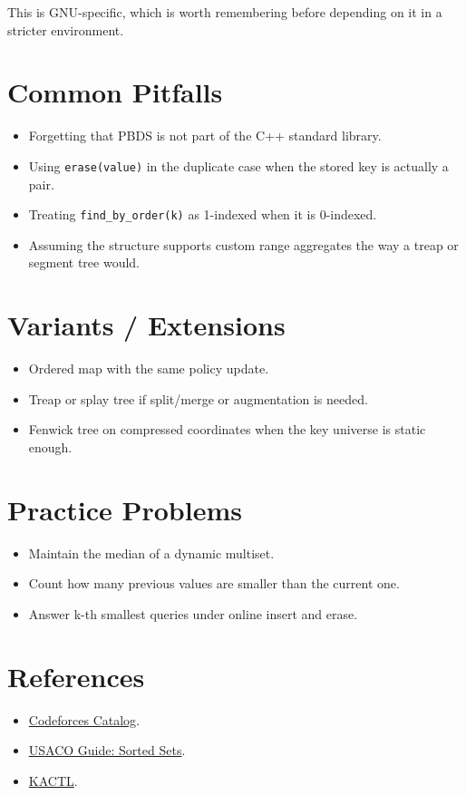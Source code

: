 This is GNU-specific, which is worth remembering before depending on it in a stricter environment.

\section*{Common Pitfalls}

\begin{itemize}
  \item Forgetting that PBDS is not part of the C++ standard library.
  \item Using \texttt{erase(value)} in the duplicate case when the stored key is actually a pair.
  \item Treating \texttt{find\_by\_order(k)} as 1-indexed when it is 0-indexed.
  \item Assuming the structure supports custom range aggregates the way a treap or segment tree would.
\end{itemize}

\section*{Variants / Extensions}

\begin{itemize}
  \item Ordered map with the same policy update.
  \item Treap or splay tree if split/merge or augmentation is needed.
  \item Fenwick tree on compressed coordinates when the key universe is static enough.
\end{itemize}

\section*{Practice Problems}

\begin{itemize}
  \item Maintain the median of a dynamic multiset.
  \item Count how many previous values are smaller than the current one.
  \item Answer k-th smallest queries under online insert and erase.
\end{itemize}

\section*{References}

\begin{itemize}
  \item \href{https://codeforces.com/catalog?locale=en}{Codeforces Catalog}.
  \item \href{https://usaco.guide/gold/intro-sorted-sets}{USACO Guide: Sorted Sets}.
  \item \href{https://github.com/kth-competitive-programming/kactl}{KACTL}.
\end{itemize}
